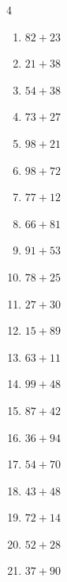 \begin{multicols}{4}
\begin{enumerate}
  \item $82+23$
        \phantom{$=105$}

  \item $21+38$
        \phantom{$=59$}

  \item $54+38$
        \phantom{$=92$}

  \item $73+27$
        \phantom{$=100$}

  \item $98+21$
        \phantom{$=119$}

  \item $98+72$
        \phantom{$=170$}

  \item $77+12$
        \phantom{$=89$}

  \item $66+81$
        \phantom{$=147$}

  \item $91+53$
        \phantom{$=144$}

  \item $78+25$
        \phantom{$=103$}

  \item $27+30$
        \phantom{$=57$}

  \item $15+89$
        \phantom{$=104$}

  \item $63+11$
        \phantom{$=74$}

  \item $99+48$
        \phantom{$=147$}

\columnbreak %

\resetques

  \item $87+42$
        \phantom{$=129$}

  \item $36+94$
        \phantom{$=130$}

  \item $54+70$
        \phantom{$=124$}

  \item $43+48$
        \phantom{$=91$}

  \item $72+14$
        \phantom{$=86$}

  \item $52+28$
        \phantom{$=80$}

  \item $37+90$
        \phantom{$=127$}


\end{enumerate}
\end{multicols}

